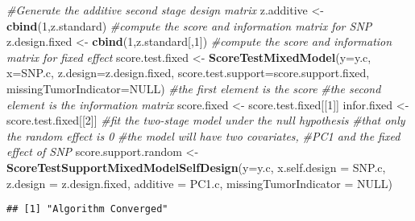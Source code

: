 \documentclass[11pt,]{article}
\newenvironment{Shaded}{\begin{snugshade}}{\end{snugshade}}
\newcommand{\CommentTok}[1]{\textcolor[rgb]{0.56,0.35,0.01}{\textit{#1}}}
\newcommand{\DataTypeTok}[1]{\textcolor[rgb]{0.13,0.29,0.53}{#1}}
\newcommand{\DecValTok}[1]{\textcolor[rgb]{0.00,0.00,0.81}{#1}}
\newcommand{\KeywordTok}[1]{\textcolor[rgb]{0.13,0.29,0.53}{\textbf{#1}}}
\newcommand{\NormalTok}[1]{#1}
\newcommand{\OtherTok}[1]{\textcolor[rgb]{0.56,0.35,0.01}{#1}}
\newcommand{\StringTok}[1]{\textcolor[rgb]{0.31,0.60,0.02}{#1}}
\begin{document}
\begin{Shaded}
\begin{Highlighting}[]
\CommentTok{#Generate the additive second stage design matrix}
\NormalTok{z.additive <-}\StringTok{ }\KeywordTok{cbind}\NormalTok{(}\DecValTok{1}\NormalTok{,z.standard)}
\CommentTok{#compute the score and information matrix for SNP}
\NormalTok{z.design.fixed <-}\StringTok{ }\KeywordTok{cbind}\NormalTok{(}\DecValTok{1}\NormalTok{,z.standard[,}\DecValTok{1}\NormalTok{])}
\CommentTok{#compute the score and information matrix for fixed effect}
\NormalTok{score.test.fixed <-}\StringTok{ }\KeywordTok{ScoreTestMixedModel}\NormalTok{(}\DataTypeTok{y=}\NormalTok{y.c,}
                    \DataTypeTok{x=}\NormalTok{SNP.c,}
                    \DataTypeTok{z.design=}\NormalTok{z.design.fixed,}
                    \DataTypeTok{score.test.support=}\NormalTok{score.support.fixed,}
                    \DataTypeTok{missingTumorIndicator=}\OtherTok{NULL}\NormalTok{)}
\CommentTok{#the first element is the score}
\CommentTok{#the second element is the information matrix}
\NormalTok{score.fixed <-}\StringTok{ }\NormalTok{score.test.fixed[[}\DecValTok{1}\NormalTok{]]}
\NormalTok{infor.fixed <-}\StringTok{ }\NormalTok{score.test.fixed[[}\DecValTok{2}\NormalTok{]]}
\CommentTok{#fit the two-stage model under the null hypothesis}
\CommentTok{#that only the random effect is 0}
\CommentTok{#the model will have two covariates, }
\CommentTok{#PC1 and the fixed effect of SNP}
\NormalTok{score.support.random <-}\StringTok{ }\KeywordTok{ScoreTestSupportMixedModelSelfDesign}\NormalTok{(}\DataTypeTok{y=}\NormalTok{y.c,}
                        \DataTypeTok{x.self.design  =}\NormalTok{ SNP.c,}
                        \DataTypeTok{z.design =}\NormalTok{ z.design.fixed,}
                        \DataTypeTok{additive =}\NormalTok{ PC1.c,}
                        \DataTypeTok{missingTumorIndicator =} \OtherTok{NULL}\NormalTok{)}
\end{Highlighting}
\end{Shaded}

\begin{verbatim}
## [1] "Algorithm Converged"
\end{verbatim}
\end{document}
